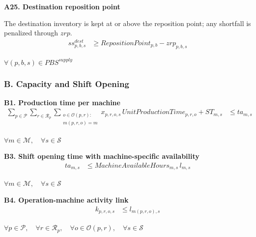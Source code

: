 \documentclass{article}
\begin{document}
\noindent\textbf{A25. Destination reposition point}

The destination inventory is kept at or above the reposition point; any shortfall is penalized through $zrp$.
\begin{align}
ss^{dest}_{p,b,s}
&\ge
RepositionPoint_{p,b}
- zrp_{p,b,s}
\label{eq:A25_dest_reposition_point}
\end{align}
\begin{center}
$\forall (p,b,s) \in PBS^{supply}$
\end{center}



\noindent\text{---------------------------------------------------------------------------------------------------------}

\subsubsection*{B. Capacity and Shift Opening}

\noindent\textbf{B1. Production time per machine}
\begin{align}
\sum_{p \in \mathcal{P}}
\sum_{r \in \mathcal{R}_p}
\sum_{\substack{o \in \mathcal{O}(p,r):\\ m(p,r,o)=m}}
x_{p,r,o,s} \, UnitProductionTime_{p,r,o}
+
ST_{m,s}
&\le
ta_{m,s}
\label{eq:B1_machine_capacity}
\end{align}
\begin{center}
$\forall m \in \mathcal{M}, \quad \forall s \in \mathcal{S}$
\end{center}

\noindent\textbf{B3. Shift opening time with machine-specific availability}
\begin{align}
ta_{m,s}
&\le
MachineAvailableHours_{m,s}\, l_{m,s}
\label{eq:B3_machine_available_hours}
\end{align}
\begin{center}
$\forall m \in \mathcal{M}, \quad
\forall s \in \mathcal{S}$
\end{center}

\noindent\textbf{B4. Operation-machine activity link}
\begin{align}
k_{p,r,o,s}
&\le
l_{m(p,r,o),s}
\label{eq:B4_machine_activity_link}
\end{align}
\begin{center}
$\forall p \in \mathcal{P}, \quad
\forall r \in \mathcal{R}_p, \quad
\forall o \in \mathcal{O}(p,r), \quad
\forall s \in \mathcal{S}$
\end{center}
\end{document}
